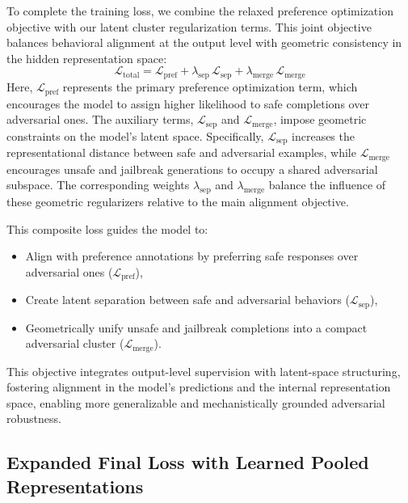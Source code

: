 To complete the training loss, we combine the relaxed preference optimization objective with our latent cluster regularization terms. This joint objective balances behavioral alignment at the output level with geometric consistency in the hidden representation space:
\[
\mathcal{L}_{\text{total}} = \mathcal{L}_{\text{pref}} + \lambda_{\text{sep}}\, \mathcal{L}_{\mathrm{sep}} + \lambda_{\text{merge}}\, \mathcal{L}_{\mathrm{merge}}
\]
Here, $\mathcal{L}_{\text{pref}}$ represents the primary preference optimization term, which encourages the model to assign higher likelihood to safe completions over adversarial ones. The auxiliary terms, $\mathcal{L}_{\mathrm{sep}}$ and $\mathcal{L}_{\mathrm{merge}}$, impose geometric constraints on the model's latent space. Specifically, $\mathcal{L}_{\mathrm{sep}}$ increases the representational distance between safe and adversarial examples, while $\mathcal{L}_{\mathrm{merge}}$ encourages unsafe and jailbreak generations to occupy a shared adversarial subspace. The corresponding weights $\lambda_{\text{sep}}$ and $\lambda_{\text{merge}}$ balance the influence of these geometric regularizers relative to the main alignment objective.

This composite loss guides the model to:
\begin{itemize}[nosep,leftmargin=1.5em]
    \item Align with preference annotations by preferring safe responses over adversarial ones ($\mathcal{L}_{\text{pref}}$),
    \item Create latent separation between safe and adversarial behaviors ($\mathcal{L}_{\mathrm{sep}}$),
    \item Geometrically unify unsafe and jailbreak completions into a compact adversarial cluster ($\mathcal{L}_{\mathrm{merge}}$).
\end{itemize}

This objective integrates output-level supervision with latent-space structuring, fostering alignment in the model’s predictions and the internal representation space, enabling more generalizable and mechanistically grounded adversarial robustness.










\subsection{Expanded Final Loss with Learned Pooled Representations}

